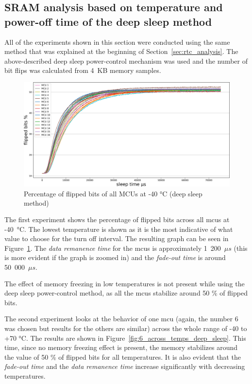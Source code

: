 \subsection[SRAM analysis based on temperature and power-off time]{SRAM analysis based on temperature and power-off time of the deep sleep method}\label{sec:deep_sleep_analysis}

All of the experiments shown in this section were conducted using the same method that was explained at the beginning of Section~\ref{sec:rtc_analysis}. The above-described deep sleep power-control mechanism was used and the number of bit flips was calculated from 4~KB memory samples.

\begin{figure}[ht!]
    \centering
    \captionsetup{justification=centering,margin=0.5cm}
    \includegraphics[width=\textwidth]{images/all_minus_40_deep_sleep.png}
    \caption{Percentage of flipped bits of all MCUs at -40 °C (deep sleep method)}
    \label{fig:all_minus_40_deep_sleep}
\end{figure}

The first experiment shows the percentage of flipped bits across all \glspl{mcu} at -40~°C. The lowest temperature is shown as it is the most indicative of what value to choose for the turn off interval. The resulting graph can be seen in Figure~\ref{fig:all_minus_40_deep_sleep}. The \emph{data remanence time} for the \glspl{mcu} is approximately 1~200~$\mu{}s$ (this is more evident if the graph is zoomed in) and the \emph{fade-out time} is around 50~000~$\mu{}s$.

The effect of memory freezing in low temperatures is not present while using the deep sleep power-control method, as all the \glspl{mcu} stabilize around 50 \% of flipped bits.

The second experiment looks at the behavior of one \gls{mcu} (again, the number 6 was chosen but results for the others are similar) across the whole range of -40 to +70 °C. The results are shown in Figure~\ref{fig:6_across_temps_deep_sleep}. This time, since no memory freezing effect is present, the memory stabilizes around the value of 50 \% of flipped bits for all temperatures. It is also evident that the \emph{fade-out time} and the \emph{data remanence time} increase significantly with decreasing temperatures.

